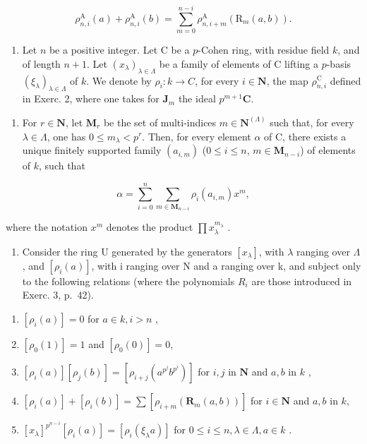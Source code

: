 \[
\rho_ {n, i} ^ {\mathrm{A}} (a) + \rho_ {n, i} ^ {\mathrm{A}} (b) = \sum_ {m = 0} ^ {n - i} \rho_ {n, i + m} ^ {\mathrm{A}} (\mathrm{R} _ {m} (a, b)).
\]

\begin{enumerate}
\def\labelenumi{\arabic{enumi})}
\setcounter{enumi}{2}
\tightlist
\item
  Let \(n\) be a positive integer. Let C be a \(p\)-Cohen ring, with residue field \(k\), and of length \(n+1\). Let \((x_{\lambda})_{\lambda\in\Lambda}\) be a family of elements of C lifting a \(p\)-basis \((\xi_{\lambda})_{\lambda\in\Lambda}\) of \(k\). We denote by \(\rho_{i}:k\to C\), for every \(i\in\mathbf{N}\), the map \(\rho_{n,i}^{\mathrm{C}}\) defined in Exerc. 2, where one takes for \(\mathbf{J}_{m}\) the ideal \(p^{m+1}\mathbf{C}\).
\end{enumerate}

\begin{enumerate}
\def\labelenumi{\alph{enumi})}
\tightlist
\item
  For \(r \in \mathbf{N}\), let \(\mathbf{M}_r\) be the set of multi-indices \(m \in \mathbf{N}^{(\Lambda)}\) such that, for every \(\lambda \in \Lambda\), one has \(0 \leqslant m_{\lambda} < p^{r}\). Then, for every element \(\alpha\) of C, there exists a unique finitely supported family \((a_{i,m})\) (\(0 \leqslant i \leqslant n\), \(m \in \mathbf{M}_{n-i}\)) of elements of \(k\), such that
\end{enumerate}

\[
\alpha = \sum_ {i = 0} ^ {n} \sum_ {m \in \mathbf {M} _ {n - i}} \rho_ {i} (a _ {i, m}) x ^ {m},
\]

where the notation \(x^{m}\) denotes the product \(\prod x_{\lambda}^{m_{\lambda}}\) .

\begin{enumerate}
\def\labelenumi{\alph{enumi})}
\setcounter{enumi}{1}
\tightlist
\item
  Consider the ring U generated by the generators \([x_{\lambda}]\), with \(\lambda\) ranging over \(\Lambda\), and \([\rho_{i}(a)]\), with i ranging over N and a ranging over k, and subject only to the following relations (where the polynomials \(R_{i}\) are those introduced in Exerc. 3, p.~42).
\end{enumerate}

\begin{enumerate}
\def\labelenumi{(\roman{enumi})}
\item
  \([\rho_i(a)] = 0\) for \(a \in k, i > n\) ,
\item
  \(\left[\rho_0(1)\right] = 1\) and \(\left[\rho_0(0)\right] = 0,\)
\item
  \([\rho_i(a)][\rho_j(b)] = [\rho_{i + j}(a^{p^j}b^{p^i})]\) for \(i,j\) in \(\mathbf{N}\) and \(a,b\) in \(k\) ,
\item
  \([\rho_i(a)] + [\rho_i(b)] = \sum [\rho_{i+m}(\mathbf{R}_m(a,b))]\) for \(i\in \mathbf{N}\) and \(a,b\) in \(k,\)
\item
  \([x_{\lambda}]^{p^{n - i}}[\rho_i(a)] = [\rho_i(\xi_{\lambda}a)]\) for \(0 \leqslant i \leqslant n, \lambda \in \Lambda, a \in k\) .
\end{enumerate}

